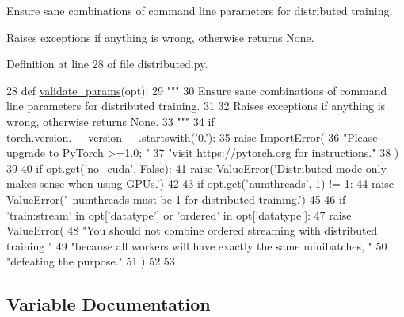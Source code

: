 \begin{DoxyVerb}Ensure sane combinations of command line parameters for distributed training.

Raises exceptions if anything is wrong, otherwise returns None.
\end{DoxyVerb}
 

Definition at line 28 of file distributed.\+py.


\begin{DoxyCode}
28 \textcolor{keyword}{def }\hyperlink{namespaceparlai_1_1utils_1_1distributed_afd854992e4cc6571b120b9e179cd4a7a}{validate\_params}(opt):
29     \textcolor{stringliteral}{"""}
30 \textcolor{stringliteral}{    Ensure sane combinations of command line parameters for distributed training.}
31 \textcolor{stringliteral}{}
32 \textcolor{stringliteral}{    Raises exceptions if anything is wrong, otherwise returns None.}
33 \textcolor{stringliteral}{    """}
34     \textcolor{keywordflow}{if} torch.version.\_\_version\_\_.startswith(\textcolor{stringliteral}{'0.'}):
35         \textcolor{keywordflow}{raise} ImportError(
36             \textcolor{stringliteral}{"Please upgrade to PyTorch >=1.0; "}
37             \textcolor{stringliteral}{"visit https://pytorch.org for instructions."}
38         )
39 
40     \textcolor{keywordflow}{if} opt.get(\textcolor{stringliteral}{'no\_cuda'}, \textcolor{keyword}{False}):
41         \textcolor{keywordflow}{raise} ValueError(\textcolor{stringliteral}{'Distributed mode only makes sense when using GPUs.'})
42 
43     \textcolor{keywordflow}{if} opt.get(\textcolor{stringliteral}{'numthreads'}, 1) != 1:
44         \textcolor{keywordflow}{raise} ValueError(\textcolor{stringliteral}{'--numthreads must be 1 for distributed training.'})
45 
46     \textcolor{keywordflow}{if} \textcolor{stringliteral}{'train:stream'} \textcolor{keywordflow}{in} opt[\textcolor{stringliteral}{'datatype'}] \textcolor{keywordflow}{or} \textcolor{stringliteral}{'ordered'} \textcolor{keywordflow}{in} opt[\textcolor{stringliteral}{'datatype'}]:
47         \textcolor{keywordflow}{raise} ValueError(
48             \textcolor{stringliteral}{"You should not combine ordered streaming with distributed training "}
49             \textcolor{stringliteral}{"because all workers will have exactly the same minibatches, "}
50             \textcolor{stringliteral}{"defeating the purpose."}
51         )
52 
53 
\end{DoxyCode}


\subsection{Variable Documentation}
\mbox{\label{namespaceparlai_1_1utils_1_1distributed_af99c57e9c67ff88f4802625436fc2c6c}} 

